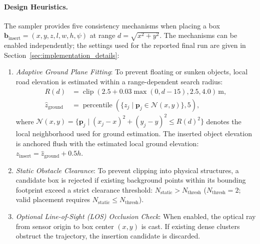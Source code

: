 \paragraph{Design Heuristics.}
The sampler provides five consistency mechanisms when placing a box $\mathbf{b}_{\mathrm{insert}} = (x, y, z, l, w, h, \psi)$ at range $d = \sqrt{x^2 + y^2}$. The mechanisms can be enabled independently; the settings used for the reported final run are given in Section~\ref{sec:implementation_details}:
\begin{enumerate}
\item \textit{Adaptive Ground Plane Fitting}: To prevent floating or sunken objects, local road elevation is estimated within a range-dependent search radius:
\begin{align}
    R(d) &= \operatorname{clip}(2.5 + 0.03\max(0, d - 15), 2.5, 4.0)\,\mathrm{m},\nonumber\\[0.8em]
    \hat{z}_{\mathrm{ground}} &= \operatorname{percentile}(\{z_j \mid \mathbf{p}_j \in \mathcal{N}(x, y)\}, 5),
    \label{eq:ground_fitting}
\end{align}
where $\mathcal{N}(x, y) = \{\mathbf{p}_j \mid (x_j - x)^2 + (y_j - y)^2 \le R(d)^2\}$ denotes the local neighborhood used for ground estimation.
The inserted object elevation is anchored flush with the estimated local ground elevation: $z_{\mathrm{insert}} = \hat{z}_{\mathrm{ground}} + 0.5h$.

\item \textit{Static Obstacle Clearance}: To prevent clipping into physical structures, a candidate box is rejected if existing background points within its bounding footprint exceed a strict clearance threshold: $N_{\mathrm{static}} > N_{\mathrm{thresh}}$ ($N_{\mathrm{thresh}} = 2$; valid placement requires $N_{\mathrm{static}} \le N_{\mathrm{thresh}}$).

\item \textit{Optional Line-of-Sight (LOS) Occlusion Check}: When enabled, the optical ray from sensor origin to box center $(x, y)$ is cast. If existing dense clusters obstruct the trajectory, the insertion candidate is discarded.


\end{enumerate}
